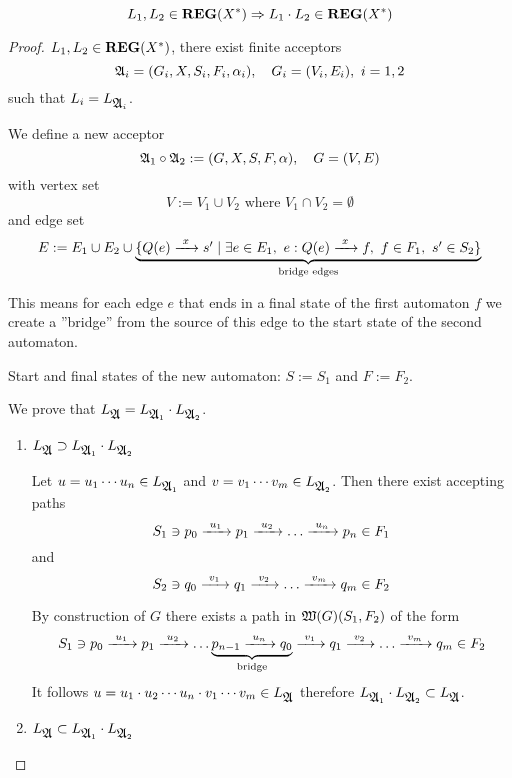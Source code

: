 \bigskip
\begin{theorem}
\[ L_1, L_2 \in \mbox{{\bf REG}}(X^*) \Rightarrow L_1 \cdot L_2 \in \mbox{{\bf REG}}(X^*) \]
\end{theorem}

\begin{proof}
$L_1, L_2 \in \mbox{{\bf REG}}(X^*)$, there exist finite acceptors
\[ \mbox{$\mathfrak{A}$}_i = (G_i, X, S_i, F_i, \alpha_i),\quad G_i = (V_i, E_i),\ i=1,2 \]
such that $L_i = L_{\mbox{$\mathfrak{A}$}_i}$.

We define a new acceptor
\[ \mbox{$\mathfrak{A}$}_1 \circ \mbox{$\mathfrak{A}$}_2 := (G, X, S, F, \alpha),\quad G = (V, E) \]
with vertex set
\[ V := V_1 \cup V_2\text{ where }V_1 \cap V_2 = \emptyset \]
and edge set
\[ E := E_1 \cup E_2 \cup \underbrace{\mbox{$\{Q(e) \xrightarrow{\ {x}\ } s' \mid \exists
e \in E_1,\ e: Q(e) \xrightarrow{\ {x}\ } f,\ f \in F_1,\ s' \in S_2\}$}}_{\text{bridge edges}}
\]

This means for each edge $e$ that ends in a final state of the first automaton 
$f$ we create a ''bridge'' from the source of this edge to the start state of
the second automaton.

Start and final states of the new automaton: $S := S_1$ and $F := F_2$.

\begin{center}

\end{center}

We prove that $L_{\mbox{$\mathfrak{A}$}} = L_{\mbox{$\mathfrak{A}$}_1} \cdot L_{\mbox{$\mathfrak{A}$}_2}$.

\begin{enumerate}
  \item $L_{\mbox{$\mathfrak{A}$}} \supset L_{\mbox{$\mathfrak{A}$}_1} \cdot L_{\mbox{$\mathfrak{A}$}_2}$
  
  Let $u = u_1 \cdots u_n \in L_{\mbox{$\mathfrak{A}$}_1}$ and $v = v_1 \cdots v_m \in
  L_{\mbox{$\mathfrak{A}$}_2}$. Then there exist accepting paths
  \[ S_1 \ni p_0 \xrightarrow{\ {u_1}\ } p_1 \xrightarrow{\ {u_2}\ } \ldots \xrightarrow{\ {u_n}\ } p_n \in F_1 \]
  and 
  \[ S_2 \ni q_0 \xrightarrow{\ {v_1}\ } q_1 \xrightarrow{\ {v_2}\ } \ldots \xrightarrow{\ {v_m}\ } q_m \in F_2 \]
  
  By construction of $G$ there exists a path in $\mbox{$\mathfrak{W}({G})$}(S_1, F_2)$ of
  the form
  \[ S_1 \ni p_0 \xrightarrow{\ {u_1}\ } p_1 \xrightarrow{\ {u_2}\ } \ldots \underbrace{p_{n-1} \xrightarrow{\ {u_n}\ }
  q_0}_{\text{bridge}} \xrightarrow{\ {v_1}\ } q_1 \xrightarrow{\ {v_2}\ } \ldots \xrightarrow{\ {v_m}\ } q_m \in F_2
  \]
  It follows $u = u_1 \cdot u_2 \cdots u_n \cdot v_1 \cdots v_m \in L_{\mbox{$\mathfrak{A}$}}$
  therefore $L_{\mbox{$\mathfrak{A}$}_1} \cdot L_{\mbox{$\mathfrak{A}$}_2} \subset L_{\mbox{$\mathfrak{A}$}}$.
  \medskip
  
  \item $L_{\mbox{$\mathfrak{A}$}} \subset L_{\mbox{$\mathfrak{A}$}_1} \cdot L_{\mbox{$\mathfrak{A}$}_2}$
  

\end{enumerate}
\end{proof}
